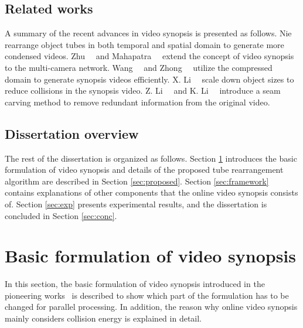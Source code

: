 \documentclass[11pt]{hyu_thesis}
\begin{document}
\subsection{Related works}
\label{sec:intro:related}
A summary of the recent advances in video synopsis is presented as follows. Nie~\etal~\cite{Nie2014} rearrange object tubes in both temporal and spatial domain to generate more condensed videos. Zhu~\etal~\cite{Zhu2014} and Mahapatra~\etal~\cite{Mahapatra2016} extend the concept of video synopsis to the multi-camera network. Wang~\etal~\cite{Wang2013} and Zhong~\etal~\cite{RuiZhong2014} utilize the compressed domain to generate synopsis videos efficiently. X. Li~\etal~\cite{Li2016a} scale down object sizes to reduce collisions in the synopsis video. Z. Li~\etal~\cite{ZhuangLi2009} and K. Li~\etal~\cite{Li2016} introduce a seam carving method to remove redundant information from the original video.

\subsection{Dissertation overview}
\label{sec:intro:overview}
The rest of the dissertation is organized as follows. Section \ref{sec:basic_form} introduces the basic formulation of video synopsis and details of the proposed tube rearrangement algorithm are described in Section \ref{sec:proposed}. Section \ref{sec:framework} contains explanations of other components that the online video synopsis consists of. Section \ref{sec:exp} presents experimental results, and the dissertation is concluded in Section \ref{sec:conc}.

\section{Basic formulation of video synopsis}
\label{sec:basic_form}

In this section, the basic formulation of video synopsis introduced in the pioneering works~\cite{Rav-Acha2006,Pritch2007,Pritch2008} is described to show which part of the formulation has to be changed for parallel processing. In addition, the reason why online video synopsis mainly considers collision energy is explained in detail.
\end{document}
